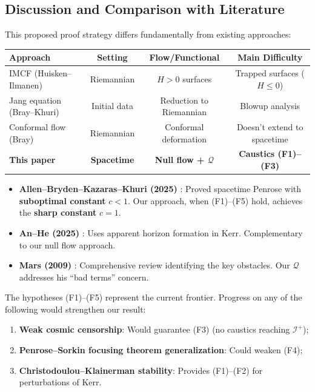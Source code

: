\subsection{Discussion and Comparison with Literature}

\begin{remark}
This proposed proof strategy differs fundamentally from existing approaches:
\begin{center}
\begin{tabular}{l|c|c|c}
\toprule
\textbf{Approach} & \textbf{Setting} & \textbf{Flow/Functional} & \textbf{Main Difficulty} \\
\midrule
IMCF (Huisken--Ilmanen) & Riemannian & $H > 0$ surfaces & Trapped surfaces ($H \leq 0$) \\
Jang equation (Bray--Khuri) & Initial data & Reduction to Riemannian & Blowup analysis \\
Conformal flow (Bray) & Riemannian & Conformal deformation & Doesn't extend to spacetime \\
\textbf{This paper} & \textbf{Spacetime} & \textbf{Null flow + $\mathcal{Q}$} & \textbf{Caustics (F1)--(F3)} \\
\bottomrule
\end{tabular}
\end{center}
\end{remark}

\begin{remark}
\begin{itemize}
\item \textbf{Allen--Bryden--Kazaras--Khuri (2025)} \cite{allenbrydentkazaraskhuri2025}: Proved spacetime Penrose with \textbf{suboptimal constant} $c < 1$. Our approach, when (F1)--(F5) hold, achieves the \textbf{sharp constant} $c = 1$.
\item \textbf{An--He (2025)} \cite{anhe2025}: Uses apparent horizon formation in Kerr. Complementary to our null flow approach.
\item \textbf{Mars (2009)} \cite{mars2009}: Comprehensive review identifying the key obstacles. Our $\mathcal{Q}$ addresses his ``bad terms'' concern.
\end{itemize}
\end{remark}

\begin{remark}
The hypotheses (F1)--(F5) represent the current frontier. Progress on any of the following would strengthen our result:
\begin{enumerate}[label=(\alph*)]
\item \textbf{Weak cosmic censorship}: Would guarantee (F3) (no caustics reaching $\mathscr{I}^+$);
\item \textbf{Penrose--Sorkin focusing theorem generalization}: Could weaken (F4);
\item \textbf{Christodoulou--Klainerman stability}: Provides (F1)--(F2) for perturbations of Kerr.
\end{enumerate}
\end{remark}

